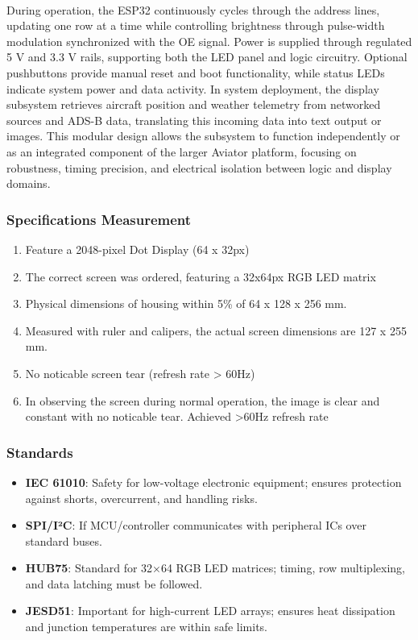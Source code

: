 \paragraph{}
During operation, the ESP32 continuously cycles through the address lines, updating one row at a time while controlling brightness through pulse-width modulation synchronized with the OE signal. 
Power is supplied through regulated 5 V and 3.3 V rails, supporting both the LED panel and logic circuitry. 
Optional pushbuttons provide manual reset and boot functionality, while status LEDs indicate system power and data activity. 
In system deployment, the display subsystem retrieves aircraft position and weather telemetry from networked sources and ADS-B data, translating this incoming data into text output or images. 
This modular design allows the subsystem to function independently or as an integrated component of the larger Aviator platform, focusing on robustness, timing precision, and electrical isolation between logic and display domains.

\subsubsection{Specifications Measurement}
\begin{enumerate}
    \item Feature a 2048-pixel Dot Display (64 x 32px)
    \item   The correct screen was ordered, featuring a 32x64px RGB LED matrix
    \item Physical dimensions of housing within 5\% of 64 x 128 x 256 mm.
    \item   Measured with ruler and calipers, the actual screen dimensions are 127 x 255 mm.
    \item No noticable screen tear (refresh rate > 60Hz)
    \item   In observing the screen during normal operation, the image is clear and constant with no noticable tear. Achieved >60Hz refresh rate
          
\end{enumerate}

\subsubsection{Standards}
\begin{itemize}
    \item \textbf{IEC 61010}: Safety for low-voltage electronic equipment; ensures protection against shorts, overcurrent, and handling risks.
    \item \textbf{SPI/I²C}: If MCU/controller communicates with peripheral ICs over standard buses.
    \item \textbf{HUB75}: Standard for 32×64 RGB LED matrices; timing, row multiplexing, and data latching must be followed.
    \item \textbf{JESD51}: Important for high-current LED arrays; ensures heat dissipation and junction temperatures are within safe limits.
\end{itemize}